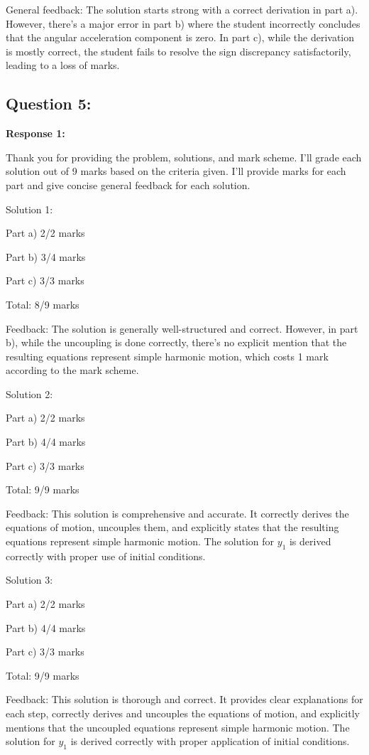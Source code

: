\documentclass[a4paper,11pt]{article}
\begin{document}
General feedback: The solution starts strong with a correct derivation in part a). However, there's a major error in part b) where the student incorrectly concludes that the angular acceleration component is zero. In part c), while the derivation is mostly correct, the student fails to resolve the sign discrepancy satisfactorily, leading to a loss of marks.

\subsection*{Question 5:}

\textbf{Response 1:}

Thank you for providing the problem, solutions, and mark scheme. I'll grade each solution out of 9 marks based on the criteria given. I'll provide marks for each part and give concise general feedback for each solution.

Solution 1:

Part a) 2/2 marks

Part b) 3/4 marks

Part c) 3/3 marks

Total: 8/9 marks

Feedback: The solution is generally well-structured and correct. However, in part b), while the uncoupling is done correctly, there's no explicit mention that the resulting equations represent simple harmonic motion, which costs 1 mark according to the mark scheme.

Solution 2:

Part a) 2/2 marks

Part b) 4/4 marks

Part c) 3/3 marks

Total: 9/9 marks

Feedback: This solution is comprehensive and accurate. It correctly derives the equations of motion, uncouples them, and explicitly states that the resulting equations represent simple harmonic motion. The solution for \(y_1\) is derived correctly with proper use of initial conditions.

Solution 3:

Part a) 2/2 marks

Part b) 4/4 marks

Part c) 3/3 marks

Total: 9/9 marks

Feedback: This solution is thorough and correct. It provides clear explanations for each step, correctly derives and uncouples the equations of motion, and explicitly mentions that the uncoupled equations represent simple harmonic motion. The solution for \(y_1\) is derived correctly with proper application of initial conditions.
\end{document}

